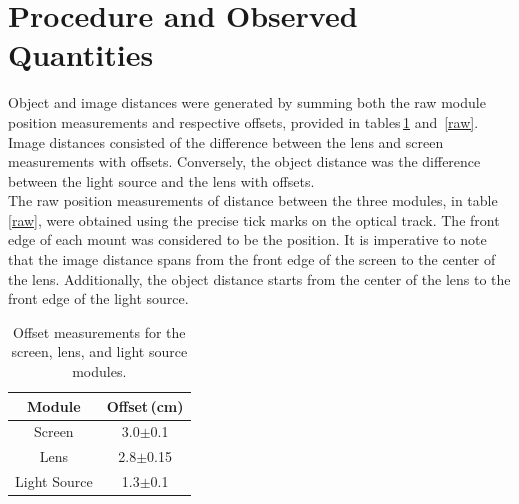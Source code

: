 \documentclass[twocolumn]{aastex6}
\begin{document}
\clearpage
\section{Procedure and Observed Quantities}

\indent Object and image distances were generated by summing both the raw module position measurements and respective offsets, provided in tables\,\ref{offsettable} and \,\ref{raw}. Image distances consisted of the difference between the lens and screen measurements with offsets. Conversely, the object distance was the difference between the light source and the lens with offsets. 
\\
\indent The raw position measurements of distance between the three modules, in table\,\ref{raw}, were obtained using the precise tick marks on the optical track. The front edge of each mount was considered to be the position. It is imperative to note that the image distance spans from the front edge of the screen to the center of the lens. Additionally, the object distance starts from the center of the lens to the front edge of the light source.

\begin{table}[h]
\begin{center}
\caption{Offset measurements for the screen, lens, and light source modules.}

\begin{tabular}{ c|c }

Module & Offset\,(cm) \\ \hline \hline
Screen & 3.0$\pm$0.1 \\
 Lens & 2.8$\pm$0.15 \\ 
 Light Source & 1.3$\pm$0.1 \\  

\end{tabular}
\label{offsettable}
\end{center}
\end{table}
\end{document}

